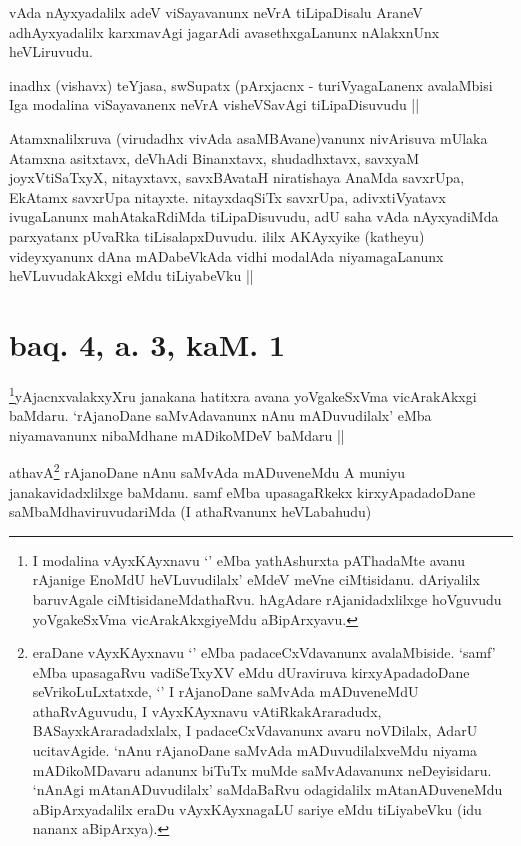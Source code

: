 \begin{artha}
vAda nAyxyadalilx adeV viSayavanunx neVrA tiLipaDisalu AraneV adhAyxyadalilx karxmavAgi jagarAdi avasethxgaLanunx nAlakxnUnx heVLiruvudu.
\end{artha}

\begin{artha}
inadhx (vishavx) teYjasa, swSupatx (pArxjacnx - turiVyagaLanenx avalaMbisi Iga modalina viSayavanenx neVrA visheVSavAgi tiLipaDisuvudu ||
\end{artha}

\begin{artha}
Atamxnalilxruva (virudadhx vivAda asaMBAvane)vanunx nivArisuva mUlaka Atamxna asitxtavx, deVhAdi Binanxtavx, shudadhxtavx, savxyaM joyxVtiSaTxyX, nitayxtavx, savxBAvataH niratishaya AnaMda savxrUpa, EkAtamx savxrUpa nitayxte. nitayxdaqSiTx savxrUpa, adivxtiVyatavx ivugaLanunx mahAtakaRdiMda tiLipaDisuvudu, adU saha vAda nAyxyadiMda parxyatanx pUvaRka tiLisalapxDuvudu. ililx AKAyxyike (katheyu) videyxyanunx dAna mADabeVkAda vidhi modalAda niyamagaLanunx heVLuvudakAkxgi eMdu tiLiyabeVku ||
\end{artha}

\section*{baq. 4, a. 3, kaM. 1}

\begin{artha}
\footnote{I modalina vAyxKAyxnavu `\stext' eMba yathAshurxta pAThadaMte avanu rAjanige EnoMdU heVLuvudilalx' eMdeV meVne ciMtisidanu. dAriyalilx baruvAgale ciMtisidaneMdathaRvu. hAgAdare rAjanidadxlilxge hoVguvudu yoVgakeSxVma vicArakAkxgiyeMdu aBipArxyavu.}yAjacnxvalakxyXru janakana hatitxra avana yoVgakeSxVma vicArakAkxgi baMdaru. `rAjanoDane saMvAdavanunx nAnu mADuvudilalx' eMba niyamavanunx nibaMdhane mADikoMDeV baMdaru ||
\end{artha}

\begin{artha}
athavA\footnote{eraDane vAyxKAyxnavu `\stext' eMba padaceCxVdavanunx avalaMbiside. `samf' eMba upasagaRvu vadiSeTxyXV eMdu dUraviruva kirxyApadadoDane seVrikoLuLxtatxde, `\stext' I rAjanoDane saMvAda mADuveneMdU athaRvAguvudu, I vAyxKAyxnavu vAtiRkakAraradudx, BASayxkAraradadxlalx, I padaceCxVdavanunx avaru noVDilalx, AdarU ucitavAgide. `nAnu rAjanoDane saMvAda mADuvudilalxveMdu niyama mADikoMDavaru adanunx biTuTx muMde saMvAdavanunx neDeyisidaru. `nAnAgi mAtanADuvudilalx' saMdaBaRvu odagidalilx mAtanADuveneMdu aBipArxyadalilx eraDu vAyxKAyxnagaLU sariye eMdu tiLiyabeVku (idu nananx aBipArxya).} rAjanoDane nAnu saMvAda mADuveneMdu A muniyu janakavidadxlilxge baMdanu. samf eMba upasagaRkekx kirxyApadadoDane saMbaMdhaviruvudariMda (I athaRvanunx heVLabahudu) 
\end{artha}

